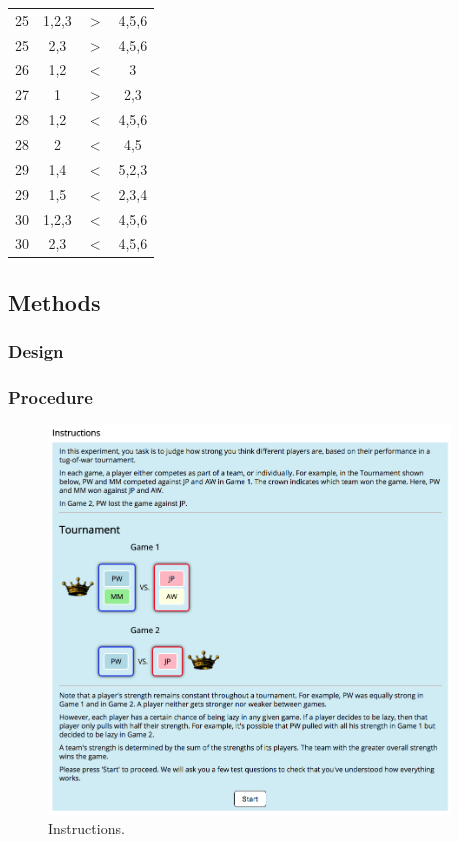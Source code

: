 \documentclass[11pt]{article}
\begin{document}
{\begin{longtable}{cccc}
  \midrule
  25 & 1,2,3 & $>$ & 4,5,6 \\ 
  25 & 2,3 & $>$ & 4,5,6 \\ 
  \midrule
  26 & 1,2 & $<$ & 3 \\ 
  \midrule
  27 & 1 & $>$ & 2,3 \\ 
  \midrule
  28 & 1,2 & $<$ & 4,5,6 \\ 
  28 & 2 & $<$ & 4,5 \\ 
  \midrule
  29 & 1,4 & $<$ & 5,2,3 \\ 
  29 & 1,5 & $<$ & 2,3,4 \\ 
  \midrule
  30 & 1,2,3 & $<$ & 4,5,6 \\ 
  30 & 2,3 & $<$ & 4,5,6 \\ 
 \bottomrule
\end{longtable}
}

\subsection{Methods}
\label{sub:methods}

\subsubsection{Design}
\label{ssub:design}

\subsubsection{Procedure}
\label{ssub:procedure}

\begin{figure}[H]
	\centering
	\includegraphics[width=0.95\textwidth]{exp1_screenshot1}
	\caption{Instructions.}
	\label{fig:exp1_screenshot1}
\end{figure}
\end{document}
